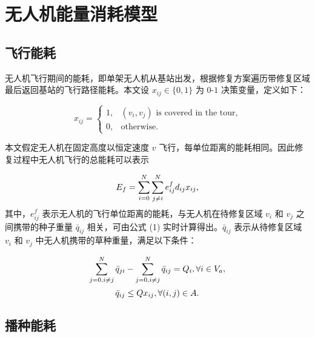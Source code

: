 \documentclass[AutoFakeBold]{LZUThesis}
\begin{document}
\section{无人机能量消耗模型}

\subsection{飞行能耗}

无人机飞行期间的能耗，即单架无人机从基站出发，根据修复方案遍历带修复区域最后返回基站的飞行路径能耗。本文设 $x_{ij} \in \{0,1\}$ 为 $0$-$1$ 决策变量，定义如下：

\begin{equation}
	x_{ij} =
	\begin{cases}
		1, & \mbox{$(v_i,v_j)$ is covered in the tour,} \\
		0, & \mbox{otherwise}.
	\end{cases}
\end{equation}

本文假定无人机在固定高度以恒定速度 $v$ 飞行，每单位距离的能耗相同。因此修复过程中无人机飞行的总能耗可以表示

\begin{equation} \label{flight-energy}
	\begin{scriptsize}
		E_f =  \sum^N_{i=0}\sum^N_{j \neq i} e^f_{ij} d_{ij} x_{ij},
	\end{scriptsize}
\end{equation}
其中，$e^f_{ij}$ 表示无人机的飞行单位距离的能耗，与无人机在待修复区域 $v_i$ 和 $v_j$ 之间携带的种子重量 $\bar{q}_{ij}$ 相关，可由公式 (1) 实时计算得出。$\bar{q}_{ij}$ 表示从待修复区域 $v_i$ 和 $v_j$ 中无人机携带的草种重量，满足以下条件：

\begin{equation} \label{remained-weight}
	\begin{scriptsize}
		\sum^N_{j=0, i\neq j}\bar{q}_{ji} -  \sum^N_{j=0, i\neq j}\bar{q}_{ij} = Q_i, \forall i \in V_a,
	\end{scriptsize}
\end{equation}
\begin{equation} \label{demanded-weight}
	\begin{small}
		\bar{q}_{ij} \leq Q x_{ij}, \forall (i,j) \in A.
	\end{small}
\end{equation}

\subsection{播种能耗}
\end{document}
